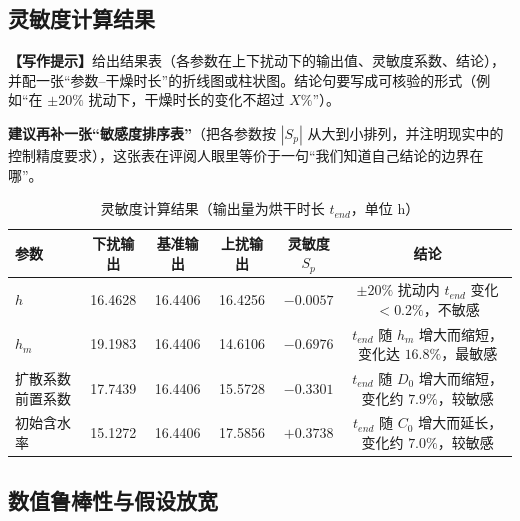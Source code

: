 \documentclass[12pt,a4paper]{article}
\newcommand{\prompt}[1]{\par\noindent\textbf{【写作提示】}#1\par}      %
\newcommand{\ph}[1]{\textbf{【#1】}}                                   %
\begin{document}
\subsection{灵敏度计算结果}

\prompt{给出结果表（各参数在上下扰动下的输出值、灵敏度系数、结论），并配一张“参数–干燥时长”的折线图或柱状图。结论句要写成可核验的形式（例如“在 $\pm20\%$ 扰动下，干燥时长的变化不超过 $X\%$”）。

\textbf{建议再补一张“敏感度排序表”}（把各参数按 $|S_p|$ 从大到小排列，并注明现实中的控制精度要求），这张表在评阅人眼里等价于一句“我们知道自己结论的边界在哪”。}

\begin{table}[H]
\centering
\caption{灵敏度计算结果（输出量为烘干时长 $t_{end}$，单位 h）}
\label{tab:sensitivity-result}
\begin{tabular}{lccccc}
\toprule
参数 & 下扰输出 & 基准输出 & 上扰输出 & 灵敏度 $S_p$ & 结论\\
\midrule
$h$ & 16.4628 & 16.4406 & 16.4256 & $-0.0057$ & $\pm20\%$ 扰动内 $t_{end}$ 变化 $<0.2\%$，不敏感\\
$h_m$ & 19.1983 & 16.4406 & 14.6106 & $-0.6976$ & $t_{end}$ 随 $h_m$ 增大而缩短，变化达 $16.8\%$，最敏感\\
扩散系数前置系数 & 17.7439 & 16.4406 & 15.5728 & $-0.3301$ & $t_{end}$ 随 $D_0$ 增大而缩短，变化约 $7.9\%$，较敏感\\
初始含水率 & 15.1272 & 16.4406 & 17.5856 & $+0.3738$ & $t_{end}$ 随 $C_0$ 增大而延长，变化约 $7.0\%$，较敏感\\
\bottomrule
\end{tabular}
\end{table}

\subsection{数值鲁棒性与假设放宽}
\end{document}
